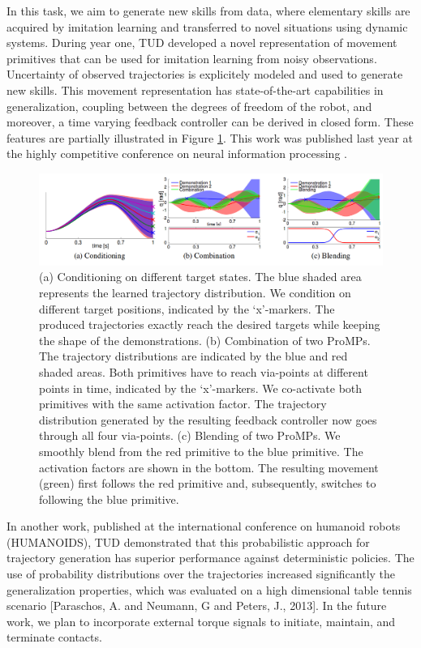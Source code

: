 \documentclass[12pt,a4paper,twoside]{article}
\begin{document}
In this task, we aim to generate new skills from data, where elementary skills 
are acquired by imitation learning and transferred to novel situations using 
dynamic systems. During year one, TUD developed a novel representation of 
movement primitives that can be used for imitation learning from noisy observations.
Uncertainty of observed trajectories is explicitely modeled and used to generate new skills.
This movement representation has state-of-the-art capabilities in generalization, 
coupling between the degrees of freedom of the robot, and moreover, 
a time varying feedback controller can be derived in closed form. 
These features are partially illustrated in Figure \ref{fig:promps}.
This work was published
last year at the highly competitive conference on neural information processing \cite{Paraschos_NIPS_2013}.

\begin{figure}[!ht]
\centering
\includegraphics[width=\textwidth]{./images/ProMPs.png}
 \caption{(a)
Conditioning on different target states. The blue shaded area represents the learned
trajectory distribution. We condition on different target positions, indicated by the ‘x’-markers. The
produced trajectories exactly reach the desired targets while keeping the shape of the demonstrations.
(b)
Combination of two ProMPs. The trajectory distributions are indicated by the blue and red
shaded areas. Both primitives have to reach via-points at different points in time, indicated by
the ‘x’-markers. We co-activate both primitives with the same activation factor. The trajectory
distribution generated by the resulting feedback controller now goes through all four via-points.
(c)
Blending of two ProMPs. We smoothly blend from the red primitive to the blue primitive. The
activation factors are shown in the bottom. The resulting movement (green) first follows the red
primitive and, subsequently, switches to following the blue primitive.
}
\label{fig:promps}
\end{figure}

In another work, published at the international conference on humanoid robots (HUMANOIDS), 
TUD demonstrated that this probabilistic approach for trajectory generation
has superior performance against deterministic policies. The use of
probability distributions over the trajectories increased significantly
 the generalization properties, which was evaluated on a high dimensional table
tennis scenario [Paraschos, A. and  Neumann, G and  Peters, J., 2013]. 
In the future work, we plan to incorporate external torque signals to initiate, 
maintain, and terminate contacts.
\end{document}
